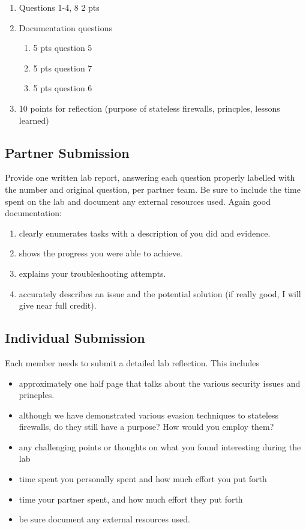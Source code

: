 \begin{enumerate}
    \item Questions 1-4, 8 2 pts
    \item Documentation questions
    \begin{enumerate}
        \item 5 pts question 5
        \item 5 pts question 7
        \item 5 pts question 6
    \end{enumerate}
    \item 10 points for reflection (purpose of stateless firewalls, princples, lessons learned)
\end{enumerate}
\subsection{Partner Submission}

Provide one written lab report, answering each question properly labelled with the number and original question, per partner team. Be sure to include the time spent on the lab and document any external resources used. 
Again good documentation: 
\begin{enumerate}
\item clearly enumerates tasks with a description of you did and evidence.  
\item shows the progress you were able to achieve.
\item explains your troubleshooting attempts.
\item accurately describes an issue and the potential solution (if really good, I will give near full credit).
\end{enumerate}


\subsection{Individual Submission}
Each member needs to submit a detailed lab reflection. This includes 
\begin{itemize}
\item approximately one half page that talks about the various security issues and princples. 
\item although we have demonstrated various evasion techniques to stateless firewalls, do they still have a purpose?  How would you employ them?
\item any challenging points or thoughts on what you found interesting during the lab 
\item time spent you personally spent and how much effort you put forth
\item time your partner spent, and how much effort they put forth
\item be sure document any external resources used. 
\end{itemize}




